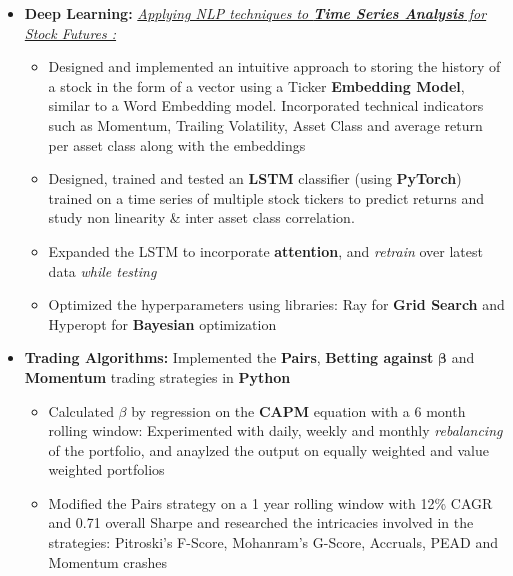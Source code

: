 \documentclass{article}
\begin{document}
\begin{itemize}[itemsep = -1 mm, leftmargin=*]
    \item \textbf{Deep Learning: }\underline{\it Applying NLP techniques to \textbf{Time Series Analysis} for Stock Futures :}
    \vspace{-7pt}
    \begin{itemize}[itemsep = -0.75 mm, leftmargin=*]
      \item Designed and implemented an intuitive approach to storing the history of a stock in the form of a vector using a Ticker \textbf{Embedding Model}, similar to a Word Embedding model. Incorporated technical indicators such as Momentum, Trailing Volatility, Asset Class and average return per asset class along with the embeddings
     \item Designed, trained and tested an \textbf{LSTM} classifier (using \textbf{PyTorch}) trained on a time series of multiple stock tickers to predict returns and study non linearity \& inter asset class correlation. 
     \item Expanded the LSTM to incorporate \textbf{attention}, and \textit{retrain} over latest data \textit{while testing}
     \item Optimized the hyperparameters using libraries: Ray for \textbf{Grid Search} and Hyperopt for \textbf{Bayesian} optimization
    \end{itemize}
    \vspace{-4pt}
    \item \textbf{Trading Algorithms:} Implemented the \textbf{Pairs}, \textbf{Betting against} $\bm{\beta}$ and \textbf{Momentum} trading strategies in \textbf{Python}
    \vspace{-7pt}
    \begin{itemize}[itemsep = -0.75 mm, leftmargin=*]
      \item Calculated $\beta$ by regression on the \textbf{CAPM} equation with a 6 month rolling window: Experimented with daily, weekly and monthly \textit{rebalancing} of the portfolio, and anaylzed the output on equally weighted and value weighted portfolios
     \item Modified the Pairs strategy on a 1 year rolling window with 12\% CAGR and 0.71 overall Sharpe and researched the intricacies involved in the strategies:  Pitroski's F-Score, Mohanram's G-Score, Accruals, PEAD and Momentum crashes
    \end{itemize}
\end{itemize}
\end{document}
